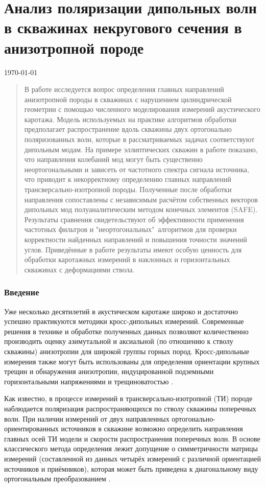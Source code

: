 \documentclass[a4paper,11pt]{article}
\begin{document}
\part*{Анализ поляризации дипольных волн в скважинах некругового сечения в анизотропной породе}
\today

\begin{abstract}

В работе исследуется вопрос	определения главных направлений анизотропной породы в скважинах с нарушением цилиндрической геометрии с помощью численного моделирования измерений акустического каротажа. Модель используемых на практике алгоритмов обработки предполагает распространение вдоль скважины двух ортогонально поляризованных волн, которые в рассматриваемых задачах соответствуют дипольным модам. На примере эллиптических скважин в работе показано, что направления колебаний мод могут быть существенно неортогональными и зависеть от частотного спектра сигнала источника, что приводит к некорректному определению главных направлений трансверсально-изотропной породы. Полученные после обработки направления сопоставлены с независимым расчётом собственных векторов дипольных мод полуаналитическим методом конечных элементов (SAFE). Результаты сравнения свидетельствуют об эффективности применения частотных фильтров и "неортогональных"\ алгоритмов для проверки корректности найденных направлений и повышения точности значений углов. Приведённые в работе результаты имеют особую ценность для обработки каротажных измерений в наклонных и горизонтальных скважинах с деформациями ствола.
\end{abstract}

\section{Введение}
Уже несколько десятилетий в акустическом каротаже широко и достаточно успешно практикуются методики кросс-дипольных измерений. Современные решения в технике и обработке полученных данных позволяют количественно производить оценку азимутальной и аксиальной (по отношению к стволу скважины) анизотропии для широкой группы горных пород. Кросс-дипольные измерения также могут быть использованы для определения ориентации крупных трещин и обнаружения анизотропии, индуцированной подземными горизонтальными напряжениями и трещиноватостью \cite{Patterson2001}.

Как известно, в процессе измерений в трансверсально-изотропной (ТИ) породе наблюдается поляризация распространяющихся по стволу скважины поперечных волн. При наличии измерений от двух направленных ортогонально-ориентированных источников в скважине возможно определить направления главных осей ТИ модели и скорости распространения поперечных волн. В основе классического метода определения лежит допущение о симметричности матрицы измерений (составленной из данных четырёх измерений с различной ориентацией источников и приёмников), которая может быть приведена к диагональному виду ортогональным преобразованием \cite{Alford1986}. 
\end{document}
